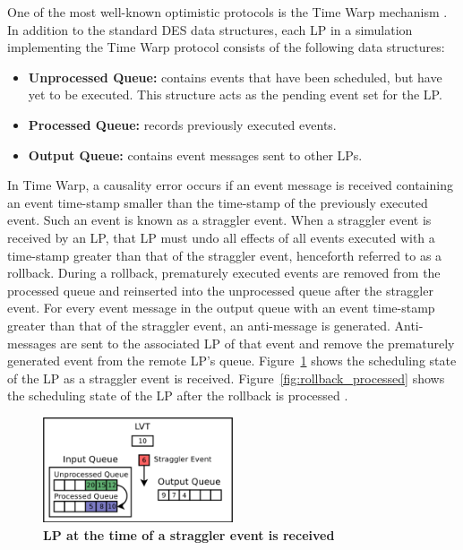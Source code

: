 \documentclass[11pt]{book}
\begin{document}
One of the most well-known optimistic protocols is the Time Warp mechanism
\cite{fujimoto}.  In addition to the standard DES data structures, each LP in a simulation
implementing the Time Warp protocol consists of the following data structures:

\begin{itemize}
  \item \textbf{Unprocessed Queue:} contains events that have been scheduled, but have yet
    to be executed.  This structure acts as the pending event set for the LP.
  \item\textbf{Processed Queue:} records previously executed events.
  \item\textbf{Output Queue:} contains event messages sent to other LPs.
\end{itemize}

In Time Warp, a causality error occurs if an event message is received containing an event
time-stamp smaller than the time-stamp of the previously executed event.  Such an event is
known as a straggler event.  When a straggler event is received by an LP, that LP must
undo all effects of all events executed with a time-stamp greater than that of the
straggler event, henceforth referred to as a rollback.  During a rollback, prematurely
executed events are removed from the processed queue and reinserted into the unprocessed
queue after the straggler event. For every event message in the output queue with an event
time-stamp greater than that of the straggler event, an anti-message is generated.
Anti-messages are sent to the associated LP of that event and remove the
prematurely generated event from the remote LP's queue.
Figure~\ref{fig:rollback_stragglerrecvd} shows the scheduling state of the LP as
a straggler event is received.  Figure~\ref{fig:rollback_processed} shows the
scheduling state of the LP after the rollback is processed \cite{dickman}.

\begin{figure}[H]
    \centering
    \graphicspath{ {./figures/} }
    \includegraphics[width=0.5\textwidth,keepaspectratio]{rollback_recv}
    \caption{\textbf{LP at the time of a straggler event is received}}
    \label{fig:rollback_stragglerrecvd}
\end{figure}
\end{document}
